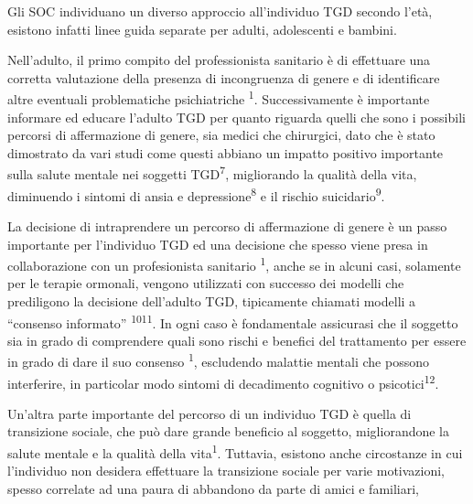 \documentclass[11pt]{article}
\begin{document}
Gli SOC individuano un diverso approccio all'individuo TGD secondo l'età, esistono infatti linee guida separate per adulti, adolescenti e bambini.

Nell'adulto, il primo compito del professionista sanitario è di effettuare una corretta valutazione della presenza di incongruenza di genere e di identificare altre eventuali problematiche psichiatriche \textsuperscript{1}.
Successivamente è importante informare ed educare l'adulto TGD per quanto riguarda quelli che sono i possibili percorsi di affermazione di genere, sia medici che chirurgici, dato che è stato dimostrato da vari studi come questi abbiano un impatto positivo importante sulla salute mentale nei soggetti TGD\textsuperscript{7}, migliorando la qualità della vita, diminuendo i sintomi di ansia e depressione\textsuperscript{8} e il rischio suicidario\textsuperscript{9}.

La decisione di intraprendere un percorso di affermazione di genere è un passo importante per l'individuo TGD ed una decisione che spesso viene presa in collaborazione con un profesionista sanitario \textsuperscript{1}, anche se in alcuni casi, solamente per le terapie ormonali, vengono utilizzati con successo dei modelli che prediligono la decisione dell'adulto TGD, tipicamente chiamati modelli a ``consenso informato'' \textsuperscript{10}\textsuperscript{11}.
In ogni caso è fondamentale assicurasi che il soggetto sia in grado di comprendere quali sono rischi e benefici del trattamento per essere in grado di dare il suo consenso \textsuperscript{1}, escludendo malattie mentali che possono interferire, in particolar modo sintomi di decadimento cognitivo o psicotici\textsuperscript{12}.

Un'altra parte importante del percorso di un individuo TGD è quella di transizione sociale, che può dare grande beneficio al soggetto, migliorandone la salute mentale e la qualità della vita\textsuperscript{1}.
Tuttavia, esistono anche circostanze in cui l'individuo non desidera effettuare la transizione sociale per varie motivazioni, spesso correlate ad una paura di abbandono da parte di amici e familiari,
\end{document}
